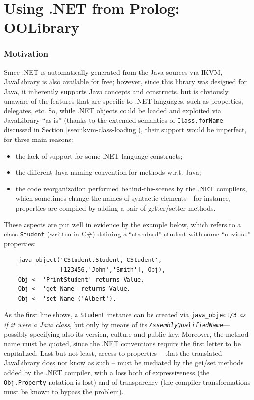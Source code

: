 \section{Using .NET from Prolog: OOLibrary}
\label{sec:dotnet-oolibrary}

\subsubsection{Motivation}

Since \tuprolog{}.NET is automatically generated from the Java sources via IKVM, JavaLibrary is also available for free; however, since this library was designed for Java, it inherently supports Java concepts and constructs, but is obviously unaware of the features that are specific to .NET languages, such as properties, delegates, etc.
%
So, while .NET objects could be loaded and exploited via JavaLibrary ``as is'' (thanks to the extended semantics of \texttt{Class.forName} discussed in Section \ref{ssec:ikvm-class-loading}), their support would be imperfect, for three main reasons:
\begin{itemize}
  \item the lack of support for some .NET language constructs;
  \item the different Java naming convention for methods w.r.t. Java;
  \item the code reorganization performed behind-the-scenes by the .NET compilers, which sometimes change the names of syntactic elements---for instance, properties are compiled by adding a pair of getter/setter methods.
\end{itemize}

\noindent These aspects are put well in evidence by the example below, which refers to a class \texttt{Student} (written in C\#) defining a ``standard'' student with some ``obvious'' properties:

\begin{verbatim}
    java_object('CStudent.Student, CStudent',
                [123456,'John','Smith'], Obj),
    Obj <- 'PrintStudent' returns Value,
    Obj <- 'get_Name' returns Value,
    Obj <- 'set_Name'('Albert').
\end{verbatim}

\noindent As the first line shows, a \texttt{Student} instance can be created via \texttt{java\_object/3} \textit{as if it were a Java class}, but only by means of its \texttt{\textit{AssemblyQualifiedName}}---possibly specifying also its version, culture and public key.
Moreover, the method name must be quoted, since the .NET conventions require the first letter to be capitalized.
Last but not least, access to properties -- that the translated JavaLibrary does not know  as such -- must be mediated by the get/set methods added by the .NET compiler, with a loss both of expressiveness (the \texttt{Obj.Property} notation is lost) and of transparency (the compiler transformations must be known to bypass the problem).

